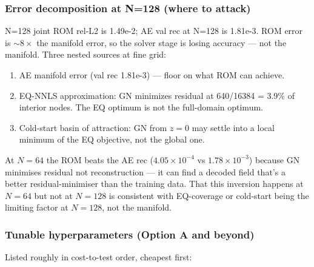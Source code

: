 \subsubsection*{Error decomposition at N=128 (where to attack)}
N=128 joint ROM rel-L2 is 1.49e-2; AE val rec at N=128 is 1.81e-3.
ROM error is $\sim 8\times$ the manifold error, so the solver stage is
losing accuracy --- not the manifold. Three nested sources at fine grid:
\begin{enumerate}
  \item AE manifold error (val rec 1.81e-3) --- floor on what ROM can achieve.
  \item EQ-NNLS approximation: GN minimizes residual at 640/16384 = 3.9\%
        of interior nodes. The EQ optimum is not the full-domain optimum.
  \item Cold-start basin of attraction: GN from $z=0$ may settle into a
        local minimum of the EQ objective, not the global one.
\end{enumerate}

At $N=64$ the ROM beats the AE rec ($4.05\times 10^{-4}$ vs $1.78\times 10^{-3}$)
because GN minimises residual not reconstruction --- it can find a decoded
field that's a better residual-minimiser than the training data. That this
inversion happens at $N=64$ but not at $N=128$ is consistent with EQ-coverage
or cold-start being the limiting factor at $N=128$, not the manifold.

\subsubsection*{Tunable hyperparameters (Option A and beyond)}
Listed roughly in cost-to-test order, cheapest first:


